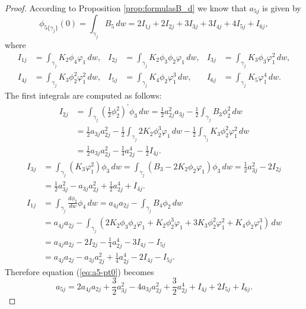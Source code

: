 \begin{proof}
According to Proposition \ref{prop:formulasB_d} we know that $a_{5j}$ is given by
\begin{equation}\label{eq:a5-pt0} 
\phi_{5\{\gamma_j\}}(0)=\int_{\gamma_j}B_5\,dw = 2I_{1j}+2I_{2j}+3I_{3j}+3I_{4j}+4I_{5j}+I_{6j}, 
\end{equation}
where 
\begin{align*}
 I_{1j}&=\int_{\gamma_j}K_2\phi_4\varphi_1\,dw, 	& I_{2j}&=\int_{\gamma_j}K_2\phi_3\phi_2\varphi_1\,dw, 	& I_{3j}&=\int_{\gamma_j}K_3\phi_3\varphi_1^2\,dw, \\
 I_{4j}&=\int_{\gamma_j}K_3\phi_2^2\varphi_1^2\,dw, 	& I_{5j}&=\int_{\gamma_j}K_4\phi_2\varphi_1^3\,dw, 	& I_{6j}&=\int_{\gamma_j}K_5\varphi_1^4\,dw.
\end{align*}
The first integrals are computed as follows:
\begin{align*}
I_{2j}	&= \int_{\gamma_j}\left(\frac{1}{2}\phi_2^2\right)^\prime\phi_3\,dw=\frac{1}{2}a_{2j}^2a_{3j}-\frac{1}{2}\int_{\gamma_j}B_3\phi_2^2\,dw \\
	&= \frac{1}{2}a_{3j}a_{2j}^2-\frac{1}{2}\int_{\gamma_j}2K_2\phi_2^3\varphi_1\,dw-\frac{1}{2}\int_{\gamma_j}K_3\phi_2^2\varphi_1^2\,dw \\
	&= \frac{1}{2}a_{3j}a_{2j}^2-\frac{1}{4}a_{2j}^4-\frac{1}{2}I_{4j}.
\end{align*}
\begin{align*}
I_{3j}	&= \int_{\gamma_j}(K_3\varphi_1^2)\phi_3\,dw=\int_{\gamma_j}(B_3-2K_2\phi_2\varphi_1)\phi_3\,dw=\frac{1}{2}a_{3j}^2-2I_{2j} \\
	&= \frac{1}{2}a_{3j}^2-a_{3j}a_{2j}^2+\frac{1}{2}a_{2j}^4+I_{4j}.
\end{align*}
\begin{align*}
I_{1j}	&= \int_{\gamma_j}\frac{d\phi_2}{dw}\phi_4\,dw=a_{4j}a_{2j}-\int_{\gamma_j}B_4\phi_2\,dw \\
	&= a_{4j}a_{2j}-\int_{\gamma_j}\left(2K_2\phi_3\phi_2\varphi_1+K_2\phi_2^3\varphi_1+3K_3\phi_2^2\varphi_1^2+K_4\phi_2\varphi_1^3\right)\,dw \\
	&= a_{4j}a_{2j}-2I_{2j}-\frac{1}{4}a_{2j}^4-3I_{4j}-I_{5j}\\
	&= a_{4j}a_{2j}-a_{3j}a_{2j}^2+\frac{1}{4}a_{2j}^4-2I_{4j}-I_{5j}.
\end{align*}
Therefore equation (\ref{eq:a5-pt0}) becomes
\begin{equation}\label{eq:a5-pt1}
a_{5j} = 2a_{4j}a_{2j}+\frac{3}{2}a_{3j}^2-4a_{3j}a_{2j}^2+\frac{3}{2}a_{2j}^4+I_{4j}+2I_{5j}+I_{6j}.
\end{equation}


\end{proof}
